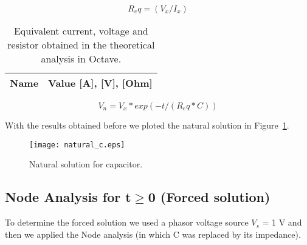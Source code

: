 \begin{equation}
R_eq = (V_x / I_x)
\end{equation}

\begin{table}[H]
  \centering
  \begin{tabular}{|l|r|}
    \hline    
    {\bf Name} & {\bf Value [A], [V], [Ohm]} \\ \hline
	
  \end{tabular}
  \caption{Equivalent current, voltage and resistor obtained in the theoretical analysis in Octave.}
  \label{tab:octave_tab2}
\end{table}
\begin{equation}
V_n = V_x * exp( -t / (R_eq * C))
\end{equation}

With the results obtained before we ploted the natural solution in Figure~\ref{fig:natural}.

\begin{figure}[H] \centering
		\texttt{[image: natural\_c.eps]}
		\caption{Natural solution for capacitor.}
	\label{fig:natural}
\end{figure}

\newpage
\subsection{Node Analysis for t$\geq$0 (Forced solution)}

\tab To determine the forced solution we used a phasor voltage source $V_s$ = 1 V and then we applied the Node analysis (in which C was replaced by its impedance).

